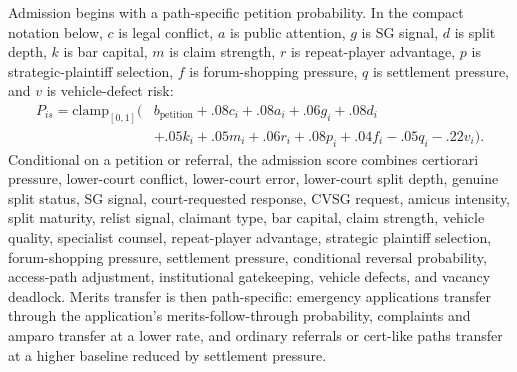 \documentclass[
    journal=jlc,
    manuscript=research-article,
    year=2026,
  ]{cup-journal}
\begin{document}
Admission begins with a path-specific petition probability. In the compact notation below, $c$ is legal conflict, $a$ is public attention, $g$ is SG signal, $d$ is split depth, $k$ is bar capital, $m$ is claim strength, $r$ is repeat-player advantage, $p$ is strategic-plaintiff selection, $f$ is forum-shopping pressure, $q$ is settlement pressure, and $v$ is vehicle-defect risk:
\[
\begin{aligned}
P_{is}=\mathrm{clamp}_{[0,1]}(&b_{\mathrm{petition}}
 + .08c_i + .08a_i + .06g_i + .08d_i \\
&+ .05k_i + .05m_i + .06r_i + .08p_i + .04f_i - .05q_i - .22v_i).
\end{aligned}
\]
Conditional on a petition or referral, the admission score combines certiorari pressure, lower-court conflict, lower-court error, lower-court split depth, genuine split status, SG signal, court-requested response, CVSG request, amicus intensity, split maturity, relist signal, claimant type, bar capital, claim strength, vehicle quality, specialist counsel, repeat-player advantage, strategic plaintiff selection, forum-shopping pressure, settlement pressure, conditional reversal probability, access-path adjustment, institutional gatekeeping, vehicle defects, and vacancy deadlock. Merits transfer is then path-specific: emergency applications transfer through the application's merits-follow-through probability, complaints and amparo transfer at a lower rate, and ordinary referrals or cert-like paths transfer at a higher baseline reduced by settlement pressure.
\end{document}
